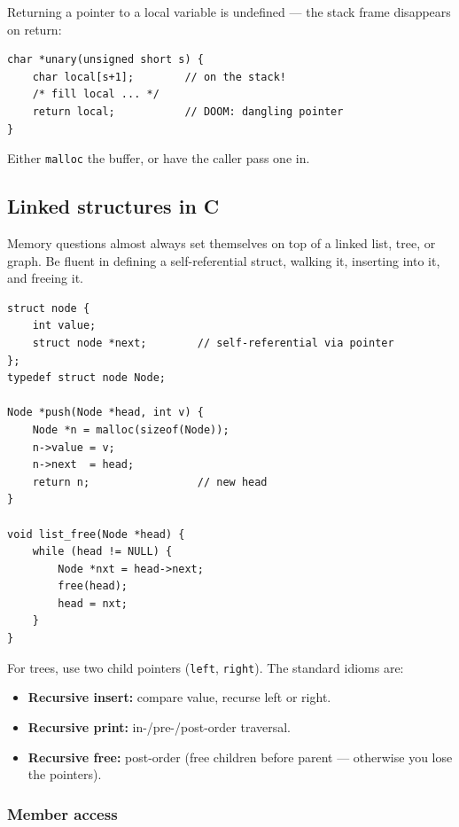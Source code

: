 \documentclass[11pt,a4paper]{article}
\begin{document}
\begin{gotcha}
Returning a pointer to a local variable is undefined --- the stack frame disappears on return:
\begin{lstlisting}
char *unary(unsigned short s) {
    char local[s+1];        // on the stack!
    /* fill local ... */
    return local;           // DOOM: dangling pointer
}
\end{lstlisting}
Either \texttt{malloc} the buffer, or have the caller pass one in.
\end{gotcha}

\subsection{Linked structures in C}

\begin{must}
Memory questions almost always set themselves on top of a linked list, tree, or graph. Be fluent in defining a self-referential struct, walking it, inserting into it, and freeing it.
\end{must}

\begin{lstlisting}
struct node {
    int value;
    struct node *next;        // self-referential via pointer
};
typedef struct node Node;

Node *push(Node *head, int v) {
    Node *n = malloc(sizeof(Node));
    n->value = v;
    n->next  = head;
    return n;                 // new head
}

void list_free(Node *head) {
    while (head != NULL) {
        Node *nxt = head->next;
        free(head);
        head = nxt;
    }
}
\end{lstlisting}

For trees, use two child pointers (\verb|left|, \verb|right|). The standard idioms are:
\begin{itemize}[leftmargin=*,itemsep=1pt]
  \item \textbf{Recursive insert:} compare value, recurse left or right.
  \item \textbf{Recursive print:} in-/pre-/post-order traversal.
  \item \textbf{Recursive free:} post-order (free children before parent --- otherwise you lose the pointers).
\end{itemize}

\subsubsection*{Member access}
\end{document}
